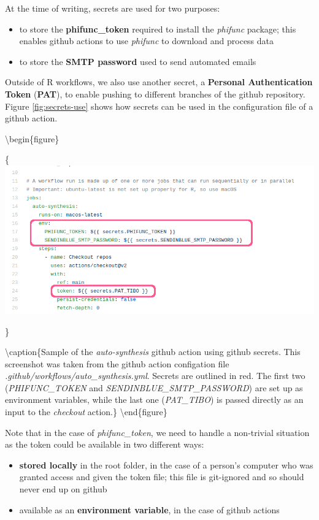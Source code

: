 \documentclass[]{book}
\providecommand{\tightlist}{%
  \setlength{\itemsep}{0pt}\setlength{\parskip}{0pt}}
\begin{document}
At the time of writing, secrets are used for two purposes:

\begin{itemize}
\tightlist
\item
  to store the \textbf{phifunc\_token} required to install the \emph{phifunc} package; this
  enables github actions to use \emph{phifunc} to download and process data
\item
  to store the \textbf{SMTP password} used to send automated emails
\end{itemize}

Outside of R workflows, we also use another secret, a \textbf{Personal Authentication
Token} (\textbf{PAT}), to enable pushing to different branches of the github
repository. Figure \ref{fig:secrets-use} shows how secrets can be used in the
configuration file of a github action.

\textbackslash{}begin\{figure\}

\{\centering \includegraphics[width=1\linewidth]{images/secrets_use}

\}

\textbackslash{}caption\{Sample of the \emph{auto-synthesis} github action using github secrets. This screenshot was taken from the github action configation file \emph{.github/workflows/auto\_synthesis.yml}. Secrets are outlined in red. The first two (\emph{PHIFUNC\_TOKEN} and \emph{SENDINBLUE\_SMTP\_PASSWORD}) are set up as environment variables, while the last one (\emph{PAT\_TIBO}) is passed directly as an input to the \emph{checkout} action.\}\label{fig:secrets-use}
\textbackslash{}end\{figure\}

Note that in the case of \emph{phifunc\_token}, we need to handle a non-trivial
situation as the token could be available in two different ways:

\begin{itemize}
\tightlist
\item
  \textbf{stored locally} in the root folder, in the case of a person's computer who was
  granted access and given the token file; this file is git-ignored and so
  should never end up on github
\item
  available as an \textbf{environment variable}, in the case of github actions
\end{itemize}
\end{document}
